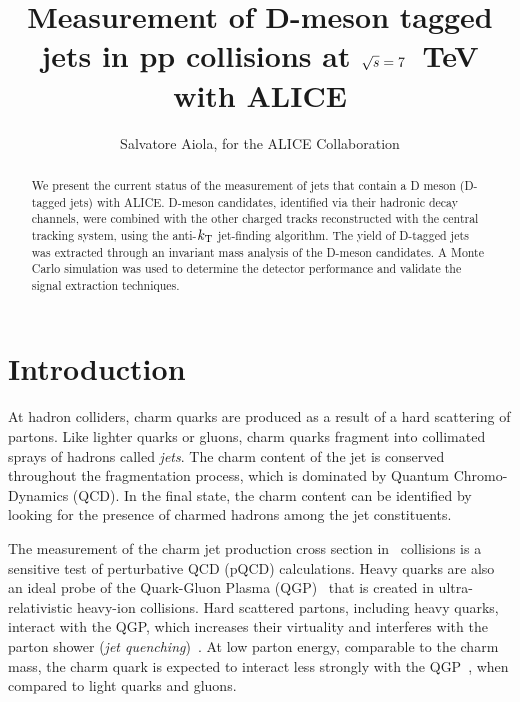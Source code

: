 \documentclass[a4paper]{jpconf}
\begin{document}
\title{Measurement of D-meson tagged jets in pp collisions at $\sqrt{s}=7$~TeV with ALICE}

\author{Salvatore Aiola, for the ALICE Collaboration}

\address{Physics Department, Yale University, 266 Whitney Avenue, New Haven, CT 06511}


\begin{abstract}
We present the current status of the measurement of jets that contain a D meson (D-tagged jets) with \mbox{ALICE}.
D-meson candidates, identified via their hadronic decay channels, were combined with the other charged tracks reconstructed with the central tracking system, 
using the anti-$k_{\rm T}$ jet-finding algorithm.
The yield of D-tagged jets was extracted through an invariant mass analysis of the D-meson candidates.
A Monte Carlo simulation was used to determine the detector performance and validate the signal extraction techniques.
\end{abstract}

\section{Introduction}
At hadron colliders, charm quarks are produced as a result of a hard scattering of partons. Like lighter quarks or gluons, charm quarks
fragment into collimated sprays of hadrons called \emph{jets}. The charm content of the jet is conserved throughout the fragmentation process,
which is dominated by Quantum Chromo-Dynamics (QCD).
In the final state, the charm content can be identified by looking for the presence of charmed hadrons among the jet constituents.

The measurement of the charm jet production cross section in \pp\ collisions is a sensitive test of perturbative QCD (pQCD) calculations.
Heavy quarks are also an ideal probe of the Quark-Gluon Plasma (QGP)~\cite{STAR:2005a, PHENIX:2005a}
that is created in ultra-relativistic heavy-ion collisions. 
Hard scattered partons, including heavy quarks, interact with the QGP, which increases their virtuality and interferes with the
parton shower (\emph{jet quenching})~\cite{PHENIX:2008b, CMS:2012b, ALICE:2015a}.
At low parton energy, comparable to the charm mass, the charm quark is expected
to interact less strongly with the QGP~\cite{Dokshitzer:2001}, when compared to light quarks and gluons.
\end{document}
